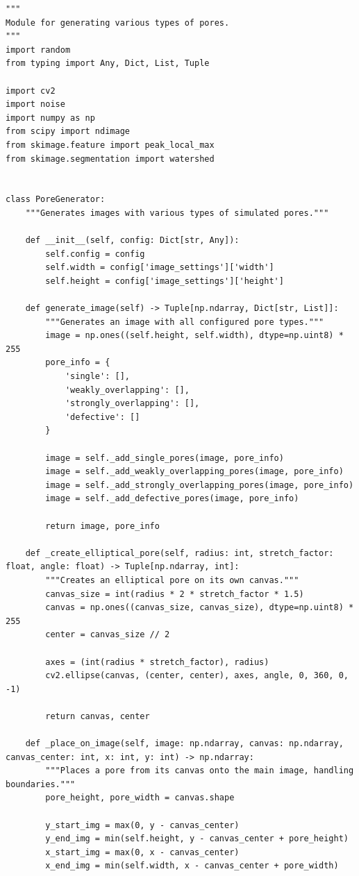 \documentclass[code]{wordcore}
\begin{document}
\begin{code}
	\begin{verbatim}
"""
Module for generating various types of pores.
"""
import random
from typing import Any, Dict, List, Tuple

import cv2
import noise
import numpy as np
from scipy import ndimage
from skimage.feature import peak_local_max
from skimage.segmentation import watershed


class PoreGenerator:
    """Generates images with various types of simulated pores."""

    def __init__(self, config: Dict[str, Any]):
        self.config = config
        self.width = config['image_settings']['width']
        self.height = config['image_settings']['height']

    def generate_image(self) -> Tuple[np.ndarray, Dict[str, List]]:
        """Generates an image with all configured pore types."""
        image = np.ones((self.height, self.width), dtype=np.uint8) * 255
        pore_info = {
            'single': [],
            'weakly_overlapping': [],
            'strongly_overlapping': [],
            'defective': []
        }

        image = self._add_single_pores(image, pore_info)
        image = self._add_weakly_overlapping_pores(image, pore_info)
        image = self._add_strongly_overlapping_pores(image, pore_info)
        image = self._add_defective_pores(image, pore_info)

        return image, pore_info

    def _create_elliptical_pore(self, radius: int, stretch_factor: float, angle: float) -> Tuple[np.ndarray, int]:
        """Creates an elliptical pore on its own canvas."""
        canvas_size = int(radius * 2 * stretch_factor * 1.5)
        canvas = np.ones((canvas_size, canvas_size), dtype=np.uint8) * 255
        center = canvas_size // 2

        axes = (int(radius * stretch_factor), radius)
        cv2.ellipse(canvas, (center, center), axes, angle, 0, 360, 0, -1)

        return canvas, center

    def _place_on_image(self, image: np.ndarray, canvas: np.ndarray, canvas_center: int, x: int, y: int) -> np.ndarray:
        """Places a pore from its canvas onto the main image, handling boundaries."""
        pore_height, pore_width = canvas.shape

        y_start_img = max(0, y - canvas_center)
        y_end_img = min(self.height, y - canvas_center + pore_height)
        x_start_img = max(0, x - canvas_center)
        x_end_img = min(self.width, x - canvas_center + pore_width)


\end{verbatim}
\end{code}
\end{document}
